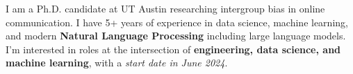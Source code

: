 I am a Ph.D. candidate at UT Austin researching intergroup bias in online communication. I have 5+ years of experience in data science, machine learning, and modern \textbf{Natural Language Processing} including large language models. I'm interested in roles at the intersection of \textbf{engineering, data science, and machine learning}, with a \emph{start date in June 2024}.

